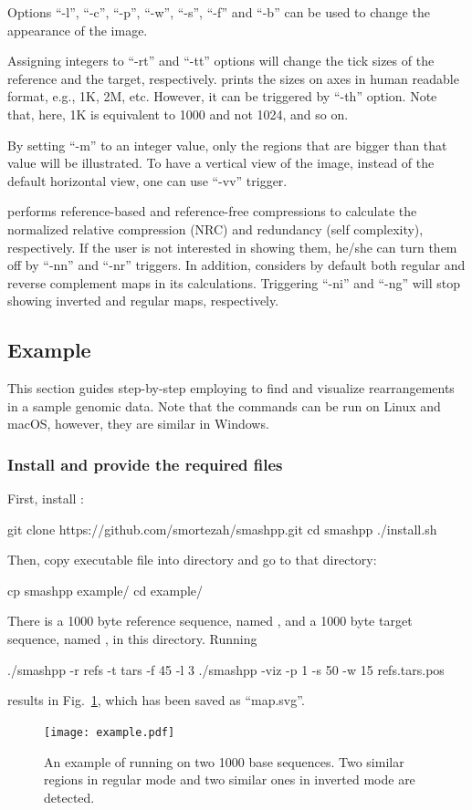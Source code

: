 Options ``-l'', ``-c'', ``-p'', ``-w'', ``-s'', ``-f'' and ``-b'' can be used to change the appearance of the image.

Assigning integers to ``-rt'' and ``-tt'' options will change the tick sizes of the reference and the target, respectively. \smashpp prints the sizes on axes in human readable format, e.g., 1K, 2M, etc. However, it can be triggered by ``-th'' option. Note that, here, 1K is equivalent to 1000 and not 1024, and so on. 

By setting ``-m'' to an integer value, only the regions that are bigger than that value will be illustrated.
To have a vertical view of the image, instead of the default horizontal view, one can use ``-vv'' trigger.

\smashpp performs reference-based and reference-free compressions to calculate the normalized relative compression (NRC) and redundancy (self complexity), respectively. If the user is not interested in showing them, he/she can turn them off by ``-nn'' and ``-nr'' triggers. In addition, \smashpp considers by default both regular and reverse complement maps in its calculations. Triggering ``-ni'' and ``-ng'' will stop showing inverted and regular maps, respectively.

\subsection{Example}
This section guides step-by-step employing \smashpp to find and visualize rearrangements in a sample genomic data. Note that the commands can be run on Linux and macOS, however, they are similar in Windows.

\subsubsection*{Install \smashpp and provide the required files}
First, install \smashpp:
\begin{code}[style=bash]
git clone https://github.com/smortezah/smashpp.git
cd smashpp
./install.sh
\end{code}
Then, copy  executable file into  directory and go to that directory:
\begin{code}[style=bash]
cp smashpp example/
cd example/
\end{code}
There is a 1000 byte reference sequence, named , and a 1000 byte target sequence, named , in this directory. Running
\begin{code}[style=bash]
./smashpp -r refs -t tars -f 45 -l 3
./smashpp -viz -p 1 -s 50 -w 15 refs.tars.pos
\end{code}
results in Fig.~\ref{fig.example}, which has been saved as ``map.svg''.

\begin{figure}[!h]
  \texttt{[image: example.pdf]}
  \caption{An example of running \smashpp on two 1000 base sequences. Two similar regions in regular mode and two similar ones in inverted mode are detected.}
  \label{fig.example}
\end{figure}